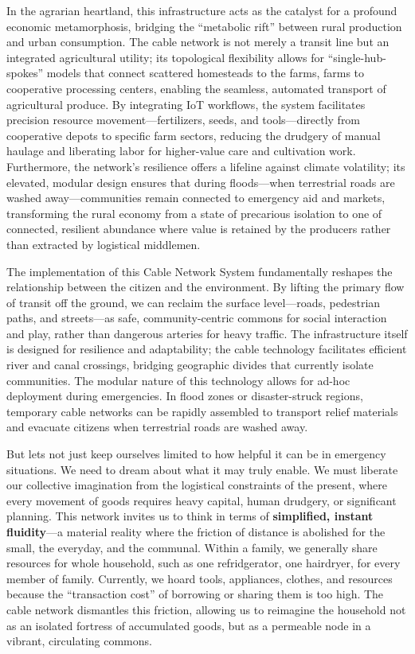 In the agrarian heartland, this infrastructure acts as the catalyst for
a profound economic metamorphosis, bridging the ``metabolic rift''
between rural production and urban consumption. The cable network is not
merely a transit line but an integrated agricultural utility; its
topological flexibility allows for ``single-hub-spokes'' models that
connect scattered homesteads to the farms, farms to cooperative
processing centers, enabling the seamless, automated transport of
agricultural produce. By integrating IoT workflows, the system
facilitates precision resource movement---fertilizers, seeds, and
tools---directly from cooperative depots to specific farm sectors,
reducing the drudgery of manual haulage and liberating labor for
higher-value care and cultivation work. Furthermore, the network's
resilience offers a lifeline against climate volatility; its elevated,
modular design ensures that during floods---when terrestrial roads are
washed away---communities remain connected to emergency aid and markets,
transforming the rural economy from a state of precarious isolation to
one of connected, resilient abundance where value is retained by the
producers rather than extracted by logistical middlemen.

The implementation of this Cable Network System fundamentally reshapes
the relationship between the citizen and the environment. By lifting the
primary flow of transit off the ground, we can reclaim the surface
level---roads, pedestrian paths, and streets---as safe,
community-centric commons for social interaction and play, rather than
dangerous arteries for heavy traffic. The infrastructure itself is
designed for resilience and adaptability; the cable technology
facilitates efficient river and canal crossings, bridging geographic
divides that currently isolate communities. The modular nature of this
technology allows for ad-hoc deployment during emergencies. In flood
zones or disaster-struck regions, temporary cable networks can be
rapidly assembled to transport relief materials and evacuate citizens
when terrestrial roads are washed away.

But lets not just keep ourselves limited to how helpful it can be in
emergency situations. We need to dream about what it may truly enable.
We must liberate our collective imagination from the logistical
constraints of the present, where every movement of goods requires heavy
capital, human drudgery, or significant planning. This network invites
us to think in terms of \textbf{simplified, instant fluidity}---a
material reality where the friction of distance is abolished for the
small, the everyday, and the communal. Within a family, we generally
share resources for whole household, such as one refridgerator, one
hairdryer, for every member of family. Currently, we hoard tools,
appliances, clothes, and resources because the ``transaction cost'' of
borrowing or sharing them is too high. The cable network dismantles this
friction, allowing us to reimagine the household not as an isolated
fortress of accumulated goods, but as a permeable node in a vibrant,
circulating commons.

